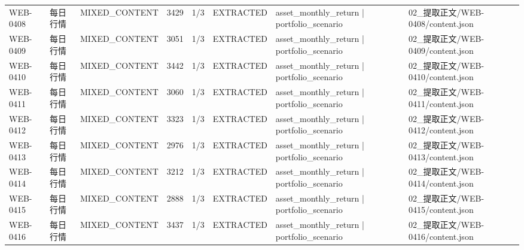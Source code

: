 \begin{landscape}
\begin{longtable}{p{1.8cm}p{4.2cm}p{3.0cm}p{1.4cm}p{1.6cm}p{2.4cm}p{4.2cm}p{4.2cm}}
WEB-0408 & 每日行情 & MIXED\_\allowbreak{}CONTENT & 3429 & 1/\allowbreak{}3 & EXTRACTED & asset\_\allowbreak{}monthly\_\allowbreak{}return | portfolio\_\allowbreak{}scenario & 02\_\allowbreak{}提取正文/\allowbreak{}WEB-0408/\allowbreak{}content.json\\
WEB-0409 & 每日行情 & MIXED\_\allowbreak{}CONTENT & 3051 & 1/\allowbreak{}3 & EXTRACTED & asset\_\allowbreak{}monthly\_\allowbreak{}return | portfolio\_\allowbreak{}scenario & 02\_\allowbreak{}提取正文/\allowbreak{}WEB-0409/\allowbreak{}content.json\\
WEB-0410 & 每日行情 & MIXED\_\allowbreak{}CONTENT & 3442 & 1/\allowbreak{}3 & EXTRACTED & asset\_\allowbreak{}monthly\_\allowbreak{}return | portfolio\_\allowbreak{}scenario & 02\_\allowbreak{}提取正文/\allowbreak{}WEB-0410/\allowbreak{}content.json\\
WEB-0411 & 每日行情 & MIXED\_\allowbreak{}CONTENT & 3060 & 1/\allowbreak{}3 & EXTRACTED & asset\_\allowbreak{}monthly\_\allowbreak{}return | portfolio\_\allowbreak{}scenario & 02\_\allowbreak{}提取正文/\allowbreak{}WEB-0411/\allowbreak{}content.json\\
WEB-0412 & 每日行情 & MIXED\_\allowbreak{}CONTENT & 3323 & 1/\allowbreak{}3 & EXTRACTED & asset\_\allowbreak{}monthly\_\allowbreak{}return | portfolio\_\allowbreak{}scenario & 02\_\allowbreak{}提取正文/\allowbreak{}WEB-0412/\allowbreak{}content.json\\
WEB-0413 & 每日行情 & MIXED\_\allowbreak{}CONTENT & 2976 & 1/\allowbreak{}3 & EXTRACTED & asset\_\allowbreak{}monthly\_\allowbreak{}return | portfolio\_\allowbreak{}scenario & 02\_\allowbreak{}提取正文/\allowbreak{}WEB-0413/\allowbreak{}content.json\\
WEB-0414 & 每日行情 & MIXED\_\allowbreak{}CONTENT & 3212 & 1/\allowbreak{}3 & EXTRACTED & asset\_\allowbreak{}monthly\_\allowbreak{}return | portfolio\_\allowbreak{}scenario & 02\_\allowbreak{}提取正文/\allowbreak{}WEB-0414/\allowbreak{}content.json\\
WEB-0415 & 每日行情 & MIXED\_\allowbreak{}CONTENT & 2888 & 1/\allowbreak{}3 & EXTRACTED & asset\_\allowbreak{}monthly\_\allowbreak{}return | portfolio\_\allowbreak{}scenario & 02\_\allowbreak{}提取正文/\allowbreak{}WEB-0415/\allowbreak{}content.json\\
WEB-0416 & 每日行情 & MIXED\_\allowbreak{}CONTENT & 3437 & 1/\allowbreak{}3 & EXTRACTED & asset\_\allowbreak{}monthly\_\allowbreak{}return | portfolio\_\allowbreak{}scenario & 02\_\allowbreak{}提取正文/\allowbreak{}WEB-0416/\allowbreak{}content.json\\

\end{longtable}
\end{landscape}

